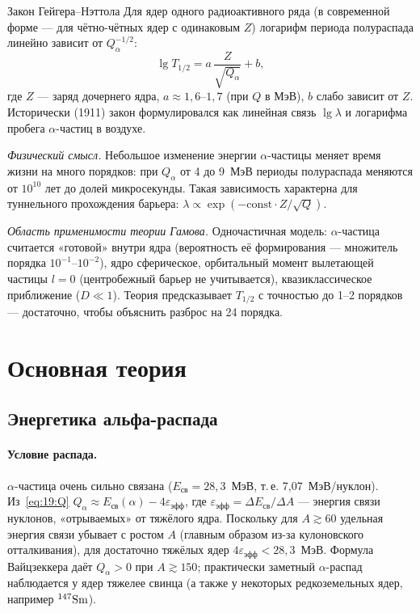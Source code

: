 \begin{principle}{Закон Гейгера--Нэттола}
Для ядер одного радиоактивного ряда (в современной форме — для чётно-чётных ядер с одинаковым $Z$) логарифм периода
полураспада линейно зависит от $Q_\alpha^{-1/2}$:
\begin{equation}\label{eq:19:GN}
  \lg T_{1/2}=a\,\frac{Z}{\sqrt{Q_\alpha}}+b ,
\end{equation}
где $Z$ — заряд дочернего ядра, $a\approx1{,}6$--$1{,}7$ (при $Q$ в МэВ), $b$ слабо зависит от $Z$. Исторически (1911) закон
формулировался как линейная связь $\lg\lambda$ и логарифма пробега $\alpha$-частиц в воздухе.
\end{principle}

\emph{Физический смысл.} Небольшое изменение энергии $\alpha$-частицы меняет время жизни на много порядков: при
$Q_\alpha$ от 4 до 9~МэВ периоды полураспада меняются от $10^{10}$ лет до долей микросекунды. Такая зависимость характерна
для туннельного прохождения барьера: $\lambda\propto\exp(-\text{const}\cdot Z/\sqrt Q)$.

\emph{Область применимости теории Гамова.} Одночастичная модель: $\alpha$-частица считается «готовой» внутри ядра
(вероятность её формирования — множитель порядка $10^{-1}$--$10^{-2}$), ядро сферическое, орбитальный момент вылетающей
частицы $l=0$ (центробежный барьер не учитывается), квазиклассическое приближение ($D\ll1$). Теория предсказывает
$T_{1/2}$ с точностью до 1--2 порядков — достаточно, чтобы объяснить разброс на 24 порядка.

\section{Основная теория}

\subsection{Энергетика альфа-распада}

\paragraph{Условие распада.} $\alpha$-частица очень сильно связана ($E_{\text{св}}=28{,}3$~МэВ, т.\,е. 7,07~МэВ/нуклон). Из~\eqref{eq:19:Q}
$Q_\alpha\approx E_{\text{св}}(\alpha)-4\varepsilon_{\text{эфф}}$, где $\varepsilon_{\text{эфф}}=\Delta E_{\text{св}}/\Delta A$ — энергия связи нуклонов, «отрываемых» от
тяжёлого ядра. Поскольку для $A\gtrsim60$ удельная энергия связи убывает с ростом $A$ (главным образом из-за кулоновского
отталкивания), для достаточно тяжёлых ядер $4\varepsilon_{\text{эфф}}<28{,}3$~МэВ. Формула Вайцзеккера даёт $Q_\alpha>0$ при $A\gtrsim150$;
практически заметный $\alpha$-распад наблюдается у ядер тяжелее свинца (а также у некоторых редкоземельных ядер,
например $\nucl{Sm}{147}$).

